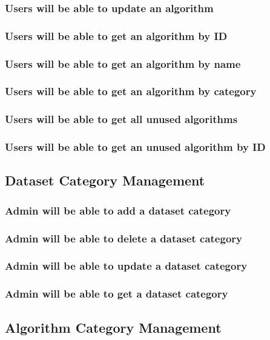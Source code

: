 \subsubsection {Users will be able to update an algorithm}
\subsubsection {Users will be able to get an algorithm by ID}
\subsubsection {Users will be able to get an algorithm by name}
\subsubsection {Users will be able to get an algorithm by category}
\subsubsection {Users will be able to get all unused algorithms}
\subsubsection {Users will be able to get an unused algorithm by ID}

\subsection{Dataset Category Management}

\subsubsection {Admin will be able to add a dataset category}
\subsubsection {Admin will be able to delete a dataset category}
\subsubsection {Admin will be able to update a dataset category}
\subsubsection {Admin will be able to get a dataset category}

\subsection{Algorithm Category Management}

